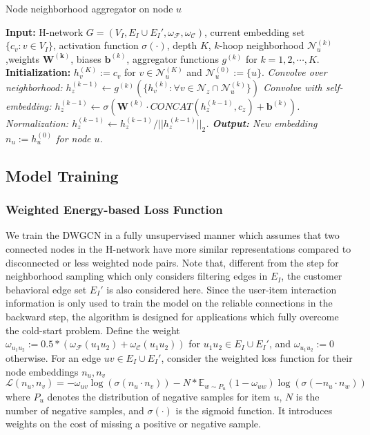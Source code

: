 \documentclass[manuscript,screen,review]{acmart}
\newcommand\Fcal{\mathcal{F}}
\newcommand{\Ccal}{\mathcal{C}}
\newcommand{\Ncal}{\mathcal{N}}
\begin{document}
\vspace{-0.5em}
\begin{algorithm}[h]
\caption{Node neighborhood aggregator on node $u$}
\label{alg:gcns}
\begin{algorithmic}[1]
\STATE \textbf{Input:} H-network $G=(V_I,E_I\cup E_I',\omega_{\mathcal{F}},\omega_{\mathcal{C}})$, current embedding set $\{c_v: v\in V_I\}$, activation function $\sigma(\cdot)$, depth $K$, $k$-hoop neighborhood $\Ncal_u^{(k)}$,weights $\mathbf{W^{(k)}}$, biases $\mathbf{b}^{(k)}$, aggregator functions $g^{(k)}$ for $k=1,2,\cdots,K$.
\STATE \textbf{Initialization:} $h_v^{(K)}:=c_v$ for $v\in \Ncal_u^{(K)}$ and $\Ncal_u^{(0)}:=\{u\}$.
\FOR{ $z\in \Ncal^{(k-1)}_u$}
\STATE \it{Convolve over neighborhood}: $h_z^{(k-1)}\leftarrow g^{(k)}\left(\{h^{(k)}_v: \forall{v}\in \Ncal_z\cap \Ncal^{(k)}_u\}\right)$
\STATE \it{Convolve with self-embedding:} $h_z^{(k-1)}\leftarrow \sigma\left(\mathbf{W}^{(k)}\cdot CONCAT(h_z^{(k-1)},c_z)+\mathbf{b}^{(k)}\right)$.
\STATE \it{Normalization: }
$h_z^{(k-1)}\leftarrow h_z^{(k-1)}/||h_z^{(k-1)}||_2$.
\ENDFOR
\ENDFOR
\STATE 
\textbf{Output:} New embedding $n_u:=h_u^{(0)}$ for node $u$.
\end{algorithmic}
\end{algorithm}
\vspace{-1em}



\subsection{Model Training}
\subsubsection{Weighted Energy-based Loss Function} We train the DWGCN in a fully unsupervised manner which assumes that two connected nodes in the H-network have more similar representations compared to disconnected or less weighted node pairs. 
Note that, different from the step for neighborhood sampling which only considers filtering edges in $E_I$, the customer behavioral edge set $E_I'$ is also considered here. Since the user-item interaction information is only used to train the model on the reliable connections in the backward step, the algorithm is designed for applications which fully overcome the cold-start problem.
Define the weight $\omega_{u_1u_2}:=0.5*\left(\omega_{\Fcal}(u_1u_2)+\omega_{\Ccal}(u_1u_2)\right)$ for $u_1u_2\in E_I\cup E_I'$, and $\omega_{u_1u_2}:=0$ otherwise.
For an edge $uv\in E_I\cup E_I'$, consider the weighted loss function for their node embeddings $n_u,n_v$ 
\[\mathcal{L}(n_u,n_v)=-\omega_{uv}\log\left(\sigma(n_u\cdot n_v)\right)-N*\mathbb{E}_{w\sim P_u}(1-\omega_{uw})\log\left(\sigma(-n_u\cdot n_w)\right)\]
where $P_u$ denotes the distribution of negative samples for item $u$, $N$ is the number of negative samples, and $\sigma(\cdot)$ is the sigmoid function. It introduces weights on the cost of missing a positive or negative sample.
\end{document}
